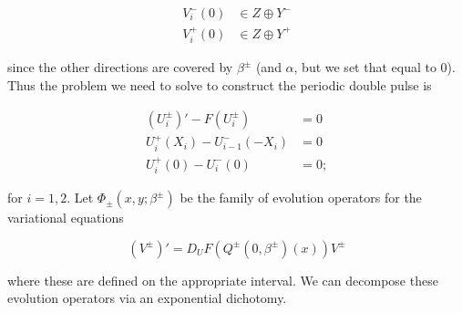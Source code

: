 \documentclass[12pt]{article}
\begin{document}
\begin{align*}
V_i^-(0) &\in Z \oplus Y^- \\
V_i^+(0) &\in Z \oplus Y^+
\end{align*}

since the other directions are covered by $\beta^\pm$ (and $\alpha$, but we set that equal to 0).\\

Thus the problem we need to solve to construct the periodic double pulse is

\begin{align*}
(U_i^\pm)' - F(U_i^\pm) &= 0 \\
U_i^+(X_i) - U_{i-1}^-(-X_i) &= 0 \\
U_i^+(0) - U_i^-(0) &= 0;
\end{align*}

for $i = 1, 2$. Let $\Phi_\pm(x, y; \beta^\pm)$ be the family of evolution operators for the variational equations

\begin{equation}
(V^\pm)' = D_U F(Q^\pm(0, \beta^\pm)(x)) V^\pm
\end{equation}

where these are defined on the appropriate interval. We can decompose these evolution operators via an exponential dichotomy.
\end{document}
